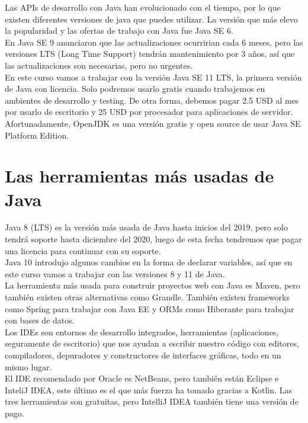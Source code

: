 \documentclass{article}
\begin{document}
Las APIs de desarrollo con Java han evolucionado con el tiempo, por lo que
existen diferentes versiones de java que puedes utilizar. La versión que más
elevo la popularidad y las ofertas de trabajo con Java fue Java SE 6.\\

En Java SE 9 anunciaron que las actualizaciones ocurririan cada 6 meses, pero
las versiones LTS (Long Time Support) tendrán mantenimiento por 3 años, así que
las actualizaciones son necesarias, pero no urgentes.\\

En este curso vamos a trabajar con la versión Java SE 11 LTS, la primera
versión de Java con licencia. Solo podremos usarlo gratis cuando trabajemos en
ambientes de desarrollo y testing. De otra forma, debemos pagar 2.5 USD al mes
por usarlo de escritorio y 25 USD por procesador para aplicaciones de
servidor.\\

Afortunadamente, OpenJDK es una versión gratis y open source de usar Java SE
Platform Edition.\\

\section{Las herramientas más usadas de Java}%
Java 8 (LTS) es la versión más usada de Java hasta inicios del 2019, pero solo
tendrá soporte hasta diciembre del 2020, luego de esta fecha tendremos que
pagar una licencia para continuar con su soporte.\\

Java 10 introdujo algunos cambios en la forma de declarar variables, así que en
este curso vamos a trabajar con las versiones 8 y 11 de Java.\\

La herramienta más usada para construir proyectos web con Java es Maven, pero
también existen otras alternativas como Grandle. También existen frameworks
como Spring para trabajar con Java EE y ORMs como Hiberante para trabajar con
bases de datos.\\

Los IDEs son entornos de desarrollo integrados, herramientas (aplicaciones,
seguramente de escritorio) que nos ayudan a escribir nuestro código con
editores, compiladores, depuradores y constructores de interfaces gráficas,
todo en un mismo lugar.\\

El IDE recomendado por Oracle es NetBeans, pero también están Eclipse e InteliJ
IDEA, este último es el que más fuerza ha tomado gracias a Kotlin. Las tres
herramientas son gratuitas, pero IntelliJ IDEA también tiene una versión de
pago.\\
\end{document}
